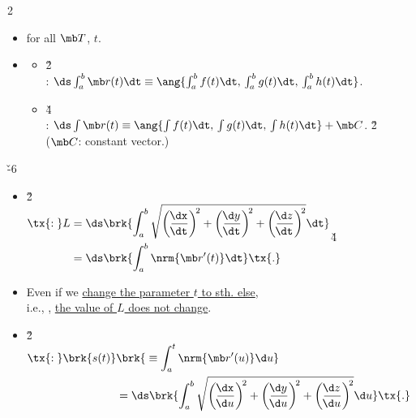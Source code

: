 \documentclass[dvipdfmx,a4paper,titlepage,9pt]{jsarticle}
\begin{document}
\begin{multicols*}{2}
\begin{itemize}[label={-}]
\item {} for all $\mb T$, $t$.

\vfill\null\columnbreak

\item{}
\begin{itemize}[label=\Cdot]
\setlength{\leftskip}{-5pt}
\item{} \v2\\
: $\ds\int_a^b\mb r(t)\dt\equiv\ang{\int_a^bf(t)\dt,\,\int_a^bg(t)\dt,\,\int_a^bh(t)\dt}$. \\

\item{} \v4\\
: $\ds\int\mb r(t)\equiv\ang{\int f(t)\dt,\,\int g(t)\dt,\,\int h(t)\dt}+\mb C$. \v2\\
\;\;($\mb C$: constant vector.) \\
\end{itemize}
\end{itemize}

\v{-6}
\begin{itemize}[label={-}]
\item{} \v2\\
$\begin{aligned}
 \tx{:\;}L&=\ds\brk{\int_a^b\sqrt{\left(\frac{\!\dx}{\!\dt}\right)^{\!2}+\left(\frac{\!\d y}{\!\dt}\right)^{\!2}+\left(\frac{\!\d z}{\!\dt}\right)^{\!2}}\dt}\\
          &=\ds\brk{\int_a^b\nrm{\mb r'(t)}\dt}\tx{.}
 \end{aligned}$\v4\\
 
\item Even if we \ul{change the parameter $t$ to sth. else}, \\
i.e., , \ul{the value of $L$ does not change}.\\
 
\item{} \v2\\
$\begin{aligned}
 \tx{:\;}\brk{s(t)}&\brk{{}\equiv\int_a^t\nrm{\mb r'(u)}\d u} \\
             &=\ds\brk{\int_a^b\sqrt{\left(\frac{\!\dx}{\!\d u}\right)^{\!2}+\left(\frac{\!\d y}{\!\d u}\right)^{\!2}+\left(\frac{\!\d z}{\!\d u}\right)^{\!2}}\d u}\tx{.}
 \end{aligned}$ \\ \; \\
\end{itemize}


\end{multicols*}
\end{document}
